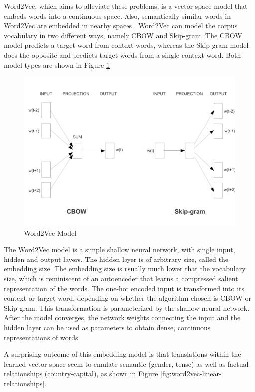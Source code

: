Word2Vec, which aims to alleviate these problems, is a vector space model that embeds words into a continuous space. Also, semantically similar words in Word2Vec are embedded in nearby spaces \citep{mikolov2013distributed,mikolov2013linguistic,le2014distributed}. Word2Vec can model the corpus vocabulary in two different ways, namely CBOW and Skip-gram. The CBOW model predicts a target word from context words, whereas the Skip-gram model does the opposite and predicts target words from a single context word. Both model types are shown in Figure \ref{fig:efficient-models}

\begin{figure}[ht]
	\centering
	\includegraphics[width=\textwidth]{images/efficient-models}
	\caption{\label{fig:efficient-models} Word2Vec Model}
\end{figure}

The Word2Vec model is a simple shallow neural network, with single input, hidden and output layers. The hidden layer is of arbitrary size, called the embedding size. The embedding size is usually much lower that the vocabulary size, which is reminiscent of an autoencoder that learns a compressed salient representation of the words. The one-hot encoded input is transformed into its context or target word, depending on whether the algorithm chosen is CBOW or Skip-gram. This transformation is parameterized by the shallow neural network. After the model converges, the network weights connecting the input and the hidden layer can be used as parameters to obtain dense, continuous representations of words.

A surprising outcome of this embedding model is that translations within the learned vector space seem to emulate semantic (gender, tense) as well as factual relationships (country-capital), as shown in Figure \ref{fig:word2vec-linear-relationships}.

